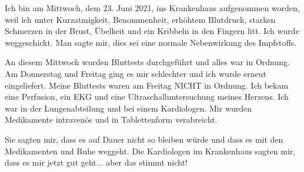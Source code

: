 Ich bin am Mittwoch, dem 23. Juni 2021, ins Krankenhaus aufgenommen worden, weil
ich unter Kurzatmigkeit, Benommenheit, erhöhtem Blutdruck, starken Schmerzen in
der Brust, Übelkeit und ein Kribbeln in den Fingern litt. Ich wurde
weggeschickt. Man sagte mir, dies sei eine normale Nebenwirkung des Impfstoffs.

An diesem Mittwoch wurden Bluttests durchgeführt und alles war in Ordnung. Am
Donnerstag und Freitag ging es mir schlechter und ich wurde erneut
eingeliefert. Meine Bluttests waren am Freitag NICHT in Ordnung. Ich bekam eine
Perfusion, ein EKG und eine Ultraschalluntersuchung meines Herzens. Ich war in
der Lungenabteilung und bei einem Kardiologen. Mir wurden Medikamente intravenös
und in Tablettenform verabreicht.

Sie sagten mir, dass es auf Dauer nicht so bleiben würde und dass es mit den
Medikamenten und Ruhe weggeht. Die Kardiologen im Krankenhaus sagten mir, dass
es mir jetzt gut geht... aber das stimmt nicht!
